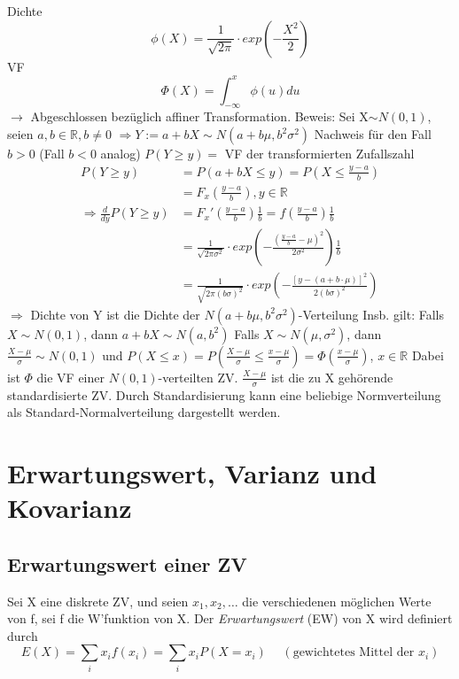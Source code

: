 \documentclass[a4paper,11pt]{article}
\begin{document}
\vspace{4pt}
\noindent Dichte 
\[\phi(X)=\frac{1}{\sqrt{2\pi}}\cdot exp(-\frac{X^2}{2})\]
\newline VF
\[\Phi(X)=\int_{-\infty}^{x}\phi(u)du\]
\newline $\rightarrow$ Abgeschlossen bezüglich affiner Transformation.
\newline Beweis:
\newline Sei X$\sim N(0,1)$, seien $a,b\in\mathbb{R},b\neq0$
\newline $\Rightarrow Y:=a+bX\sim N(a+b\mu,b^2\sigma^2)$
\newline Nachweis für den Fall $b>0$ (Fall $b<0$ analog)
\newline $P(Y\geq y) =$ VF der transformierten Zufallszahl
\begin{align*}
P(Y\geq y) &= P(a+bX\leq y) = P(X\leq\frac{y-a}{b})\\
&= F_x(\frac{y-a}{b}), y\in\mathbb{R}\\
\Rightarrow \frac{d}{dy}P(Y\geq y) &= F_x'(\frac{y-a}{b})\frac{1}{b} = f(\frac{y-a}{b})\frac{1}{b}\\
&= \frac{1}{\sqrt{2\pi\sigma^2}}\cdot exp(-\frac{(\frac{y-a}{b}-\mu)^2}{2\sigma^2})\frac{1}{b}\\
&= \frac{1}{\sqrt{2\pi(b\sigma)^2}}\cdot exp(-\frac{[y-(a+b\cdot\mu)]^2}{2(b\sigma)^2})
\end{align*}
\noindent $\Rightarrow$ Dichte von Y ist die Dichte der $N(a+b\mu,b^2\sigma^2)$-Verteilung
\newline Insb. gilt:
\newline Falls $X\sim N(0,1)$, dann $a+bX\sim N(a,b^2)$
\newline Falls $X\sim N(\mu,\sigma^2)$, dann $\frac{X-\mu}{\sigma}\sim N(0,1)$ 
\newline\indent und $P(X\leq x) = P(\frac{X-\mu}{\sigma}\leq\frac{x-\mu}{\sigma}) = \Phi(\frac{x-\mu}{\sigma})$, $x\in\mathbb{R}$
\newline Dabei ist $\Phi$ die VF einer $N(0,1)$-verteilten ZV. $\frac{X-\mu}{\sigma}$ ist die zu X gehörende standardisierte ZV.
Durch Standardisierung kann eine beliebige Normverteilung als Standard-Normalverteilung dargestellt werden.

\section{Erwartungswert, Varianz und Kovarianz}

\subsection{Erwartungswert einer ZV}
Sei X eine diskrete ZV, und seien $x_1,x_2,\dots$ die verschiedenen möglichen Werte von f, sei f die W'funktion von X. 
\newline Der \textit{Erwartungswert} (EW) von X wird definiert durch
\[E(X)=\sum_{i}x_if(x_i)=\sum_{i}x_iP(X=x_i) \hspace{15pt}(\text{gewichtetes Mittel der }x_i)\]
\end{document}
